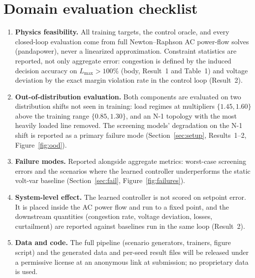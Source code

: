 \documentclass{article}
\begin{document}
\section*{Domain evaluation checklist}

\begin{enumerate}[leftmargin=1.4em,itemsep=2pt,topsep=2pt]
  \item \textbf{Physics feasibility.} All training targets, the control
  oracle, and every closed-loop evaluation come from full Newton--Raphson
  AC power-flow solves (pandapower), never a linearized approximation.
  Constraint statistics are reported, not only aggregate error: congestion
  is defined by the induced decision accuracy on $L_{\max}>100\%$ (body,
  Result~1 and Table~1) and voltage deviation by the exact margin
  violation rate in the control loop (Result~2).
  \item \textbf{Out-of-distribution evaluation.} Both components are
  evaluated on two distribution shifts not seen in training: load regimes
  at multipliers $\{1.45,1.60\}$ above the training range $\{0.85,1.30\}$,
  and an N-1 topology with the most heavily loaded line removed. The
  screening models' degradation on the N-1 shift is reported as a primary
  failure mode (Section~\ref{sec:setup}, Results~1--2, Figure~\ref{fig:ood}).
  \item \textbf{Failure modes.} Reported alongside aggregate metrics:
  worst-case screening errors and the scenarios where the learned
  controller underperforms the static volt-var baseline
  (Section~\ref{sec:fail}, Figure~\ref{fig:failures}).
  \item \textbf{System-level effect.} The learned controller is not scored
  on setpoint error. It is placed inside the AC power flow and run to a
  fixed point, and the downstream quantities (congestion rate, voltage
  deviation, losses, curtailment) are reported against baselines run in
  the same loop (Result~2).
  \item \textbf{Data and code.} The full pipeline (scenario generators,
  trainers, figure script) and the generated data and per-seed result
  files will be released under a permissive license at an anonymous link
  at submission; no proprietary data is used.
\end{enumerate}
\end{document}
